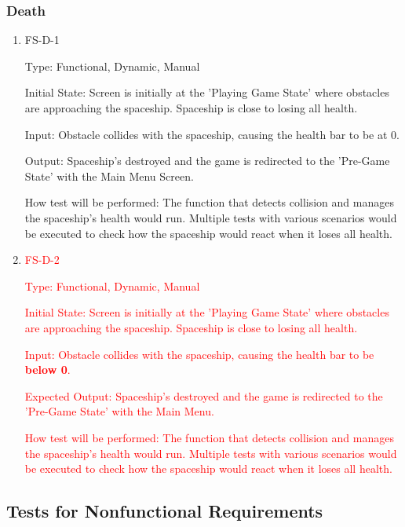 \documentclass[12pt, titlepage]{article}
\begin{document}
\subsubsection{Death}

\begin{enumerate}

\item{FS-D-1\\}

Type: Functional, Dynamic, Manual
					
Initial State: Screen is initially at the 'Playing Game State' where obstacles are approaching the spaceship. Spaceship is close to losing all health.
					
Input: Obstacle collides with the spaceship, causing the health bar to be at 0. 
					
Output: Spaceship's destroyed and the game is redirected to the 'Pre-Game State' with the Main Menu Screen.
					
How test will be performed: The function that detects collision and manages the spaceship's health would run. Multiple tests with various scenarios would be executed to check how the spaceship would react when it loses all health. 

\item\textcolor{red}{FS-D-2\\}

\textcolor{red}{Type: Functional, Dynamic, Manual}

\textcolor{red}{Initial State: Screen is initially at the 'Playing Game State' where obstacles are approaching the spaceship. Spaceship is close to losing all health.}
					
\textcolor{red}{Input: Obstacle collides with the spaceship, causing the health bar to be \textbf{below 0}.}
					
\textcolor{red}{Expected Output: Spaceship's destroyed and the game is redirected to the 'Pre-Game State' with the Main Menu.}
		
\textcolor{red}{How test will be performed: The function that detects collision and manages the spaceship's health would run. Multiple tests with various scenarios would be executed to check how the spaceship would react when it loses all health.}
			
\end{enumerate}

\subsection{Tests for Nonfunctional Requirements}
\end{document}
